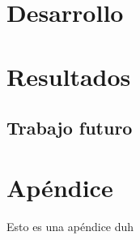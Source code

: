 \documentclass{proyectoelectrico}
\begin{document}
\chapter{Desarrollo}
\label{sec:org8bc4846}
\chapter{Resultados}
\label{sec:orga2c7b2a}
\section{Trabajo futuro}
\label{sec:org9cad9ef}

\begin{LaTeX}
\appendix
\end{LaTeX}
\chapter{Apéndice}
\label{sec:org7e2aa08}
Esto es una apéndice duh



 

\end{document}

